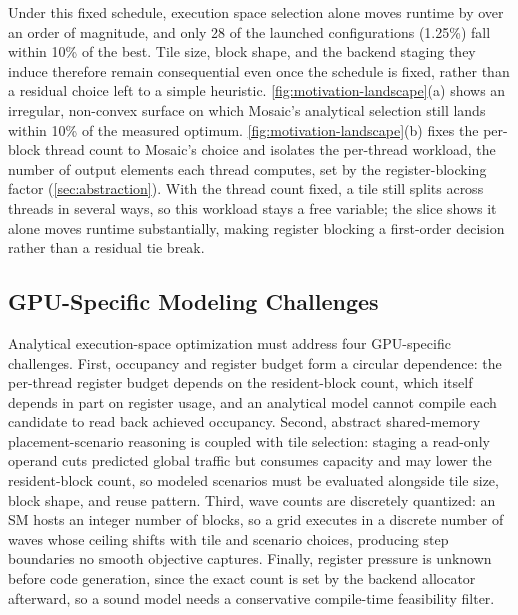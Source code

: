 \documentclass[acmsmall,review,anonymous,screen]{acmart}
\newcommand{\name}{{Mosaic}\xspace}
\begin{document}
Under this fixed schedule, execution space selection alone moves runtime by over an order of magnitude, and only 28 of the launched configurations (1.25\%) fall within 10\% of the best. Tile size, block shape, and the backend staging they induce therefore remain consequential even once the schedule is fixed, rather than a residual choice left to a simple heuristic. \autoref{fig:motivation-landscape}(a) shows an irregular, non-convex surface on which \name's analytical selection still lands within 10\% of the measured optimum. \autoref{fig:motivation-landscape}(b) fixes the per-block thread count to \name's choice and isolates the per-thread workload, the number of output elements each thread computes, set by the register-blocking factor (\autoref{sec:abstraction}). With the thread count fixed, a tile still splits across threads in several ways, so this workload stays a free variable; the slice shows it alone moves runtime substantially, making register blocking a first-order decision rather than a residual tie break.

\subsection{GPU-Specific Modeling Challenges}
\label{sec:bg-challenges}
\label{sec:gpu-modeling-challenges}

\label{sec:challenge-register-cycle}
\label{sec:challenge-placement}
\label{sec:challenge-discrete-objective}
\label{sec:challenge-register-pressure}

Analytical execution-space optimization must address four GPU-specific challenges. First, occupancy and register budget form a circular dependence: the per-thread register budget depends on the resident-block count, which itself depends in part on register usage, and an analytical model cannot compile each candidate to read back achieved occupancy. Second, abstract shared-memory placement-scenario reasoning is coupled with tile selection: staging a read-only operand cuts predicted global traffic but consumes capacity and may lower the resident-block count, so modeled scenarios must be evaluated alongside tile size, block shape, and reuse pattern. Third, wave counts are discretely quantized: an SM hosts an integer number of blocks, so a grid executes in a discrete number of waves whose ceiling shifts with tile and scenario choices, producing step boundaries no smooth objective captures. Finally, register pressure is unknown before code generation, since the exact count is set by the backend allocator afterward, so a sound model needs a conservative compile-time feasibility filter.
\end{document}
